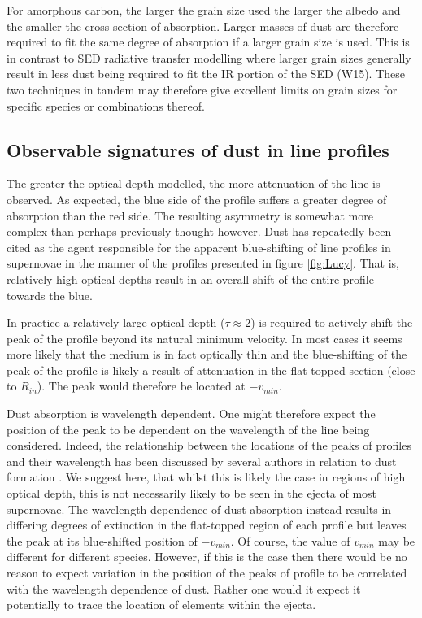 \documentclass[useAMS,usenatbib,usegraphicx]{mnras}
\begin{document}
For amorphous carbon, the larger the grain size used the larger the albedo 
and the smaller the cross-section of absorption.  Larger masses of dust 
are therefore required to fit the same degree of absorption if a larger 
grain size is used.  This is in contrast to SED radiative transfer 
modelling where larger grain sizes generally result in less dust being 
required to fit the IR portion of the SED (W15).  These two techniques in 
tandem may therefore give excellent limits on grain sizes for specific 
species or combinations thereof.


\subsection{Observable signatures of dust in line profiles}
\label{asym}

The greater the optical depth modelled, the more attenuation of the line 
is observed.  As expected, the blue side of the profile suffers a greater 
degree of absorption than the red side.  The resulting asymmetry is 
somewhat more complex than perhaps previously thought however.  Dust has 
repeatedly been cited as the agent responsible for the apparent 
blue-shifting of line profiles in supernovae in the manner of the profiles 
presented in figure \ref{fig:Lucy}.  That is, relatively high optical 
depths result in an overall shift of the entire profile towards the blue.

In practice a relatively large optical depth ($\tau \approx 2$) is 
required to actively shift the peak of the profile beyond its natural 
minimum velocity.  In most cases it seems more likely that the medium is 
in fact optically thin and the blue-shifting of the peak of the profile is 
likely a result of attenuation in the flat-topped section (close to 
$R_{in}$).  The peak would therefore be located at $-v_{min}$.

Dust absorption is wavelength dependent.  One might therefore expect the 
position of the peak to be dependent on the wavelength of the line being 
considered.  Indeed, the relationship between the locations of the peaks 
of profiles and their wavelength has been discussed by several authors in 
relation to dust formation \citep{Gall2014,Fransson2013,Smith2012}.  We 
suggest here, that whilst this is likely the case in regions of high 
optical depth, this is not necessarily likely to be seen in the ejecta of 
most supernovae.  The wavelength-dependence of dust absorption instead 
results in differing degrees of extinction in the flat-topped region of 
each profile but leaves the peak at its blue-shifted position of 
$-v_{min}$.  Of course, the value of $v_{min}$ may be different for 
different species.  However, if this is the case then there would be no 
reason to expect variation in the position of the peaks of profile to be 
correlated with the wavelength dependence of dust.  Rather one would it 
expect it potentially to trace the location of elements within the ejecta.
\end{document}
